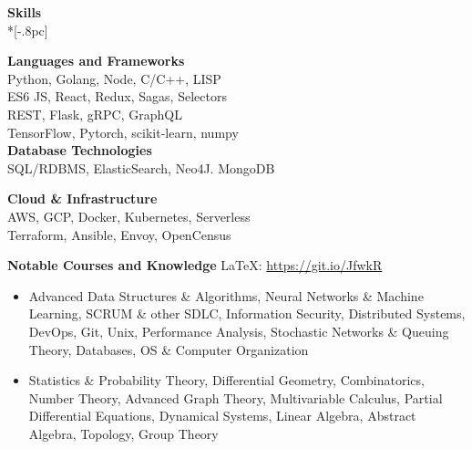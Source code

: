\documentclass{article}
\newcommand{\centerbullet}{$\vcenter{\hbox{\tiny$\bullet$}} \ $}
\begin{document}
\vspace{4pt}
{\large \bf Skills} \\*[-.8pc]
\underline{\hspace{6.1in}}

\begin{centering}
\vspace{-8pt}
\begin{multicols}{2}
{\bf Languages and Frameworks}\\
Python, Golang, Node, C/C++, LISP\\
ES6 JS, React, Redux, Sagas, Selectors \\
REST, Flask, gRPC, GraphQL  \\   
TensorFlow, Pytorch, scikit-learn, numpy\\
{ \bf Database Technologies}\\
SQL/RDBMS, ElasticSearch, Neo4J. MongoDB

{\bf Cloud \& Infrastructure }\\
AWS, GCP, Docker, Kubernetes, Serverless \\
Terraform, Ansible, Envoy, OpenCensus
\end{multicols}
\end{centering}
\vspace{-8pt}
{\bf Notable Courses and Knowledge} \hfill \LaTeX: \url{https://git.io/JfwkR} 
\begin{itemize}[leftmargin=*]
\itemsep0em
\renewcommand\labelitemi{\tiny$\bullet$}
    \item Advanced Data Structures \& Algorithms, Neural Networks \& Machine Learning, SCRUM \& other SDLC,  Information Security, Distributed Systems, DevOps, Git, Unix, Performance Analysis, Stochastic Networks \& Queuing Theory, Databases, OS \& Computer Organization
    \item Statistics \& Probability Theory, Differential Geometry, Combinatorics, Number Theory, Advanced Graph Theory, Multivariable Calculus, Partial Differential Equations, Dynamical Systems, Linear Algebra, Abstract Algebra, Topology, Group Theory
\end{itemize}

\end{document}
